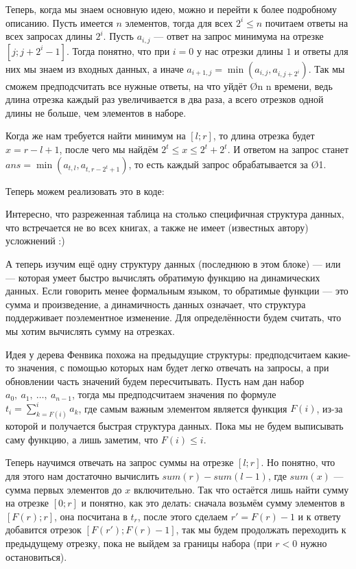 {Теперь, когда мы знаем основную идею, можно и перейти к более подробному описанию. Пусть имеется $n$ элементов, тогда для всех $2^i \leq n$ почитаем ответы на всех запросах длины $2^i$. Пусть $a_{i, j}$ — ответ на запрос минимума на отрезке $[j; j + 2^i - 1]$. Тогда понятно, что при $i = 0$ у нас отрезки длины $1$ и ответы для них мы знаем из входных данных, а иначе $a_{i + 1, j} = \min( a_{i, j}, a_{i, j + 2^i} )$. Так мы сможем предподсчитать все нужные ответы, на что уйдёт \O{n \log n} времени, ведь длина отрезка каждый раз увеличивается в два раза, а всего отрезков одной длины не больше, чем элементов в наборе.

Когда же нам требуется найти минимум на $[l; r]$, то длина отрезка будет $x = r - l + 1$, после чего мы найдём $2^t \leq x \leq 2^t + 2^t$. И ответом на запрос станет $ans = \min( a_{t, l} ,  a_{t, r - 2^t + 1} )$, то есть каждый запрос обрабатывается за \O{1}.

Теперь можем реализовать это в коде:


Интересно, что разреженная таблица на столько специфичная структура данных, что встречается не во всех книгах, а также не имеет (известных автору) усложнений :)


А теперь изучим ещё одну структуру данных (последнюю в этом блоке) —  или  — которая умеет быстро вычислять обратимую функцию на динамических данных. Если говорить менее формальным языком, то обратимые функции — это сумма и произведение, а динамичность данных означает, что структура поддерживает поэлементное изменение. Для определённости будем считать, что мы хотим вычислять сумму на отрезках.

Идея у дерева Фенвика похожа на предыдущие структуры: предподсчитаем какие-то значения, с помощью которых нам будет легко отвечать на запросы, а при обновлении часть значений будем пересчитывать. Пусть нам дан набор $a_0,\ a_1,\ \ldots,\ a_{n - 1}$, тогда мы предподсчитаем значения по формуле $t_i = \sum\limits_{k=F(i)}^{i} a_k$, где самым важным элементом является функция $F(i)$, из-за которой и получается быстрая структура данных. Пока мы не будем выписывать саму функцию, а лишь заметим, что $F(i) \leq i$.

Теперь научимся отвечать на запрос суммы на отрезке $[l;r]$. Но понятно, что для этого нам достаточно вычислить $sum(r) - sum(l - 1)$, где $sum(x)$ — сумма первых элементов до $x$ включительно. Так что остаётся лишь найти сумму на отрезке $[0; r]$ и понятно, как это делать: сначала возьмём сумму элементов в $[F(r); r]$, она посчитана в $t_r$, после этого сделаем $r' = F(r) - 1$ и к ответу добавится отрезок $[F(r'); F(r) - 1]$, так мы будем продолжать переходить к предыдущему отрезку, пока не выйдем за границы набора (при $r < 0$ нужно остановиться).

}
